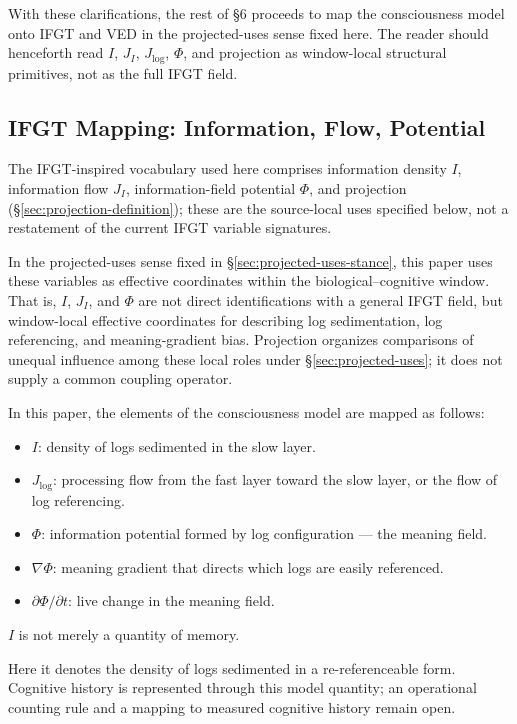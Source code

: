 With these clarifications, the rest of §6 proceeds to map the
consciousness model onto IFGT and VED in the projected-uses sense fixed
here. The reader should henceforth read \(I\), \(J_I\),
\(J_{\mathrm{log}}\), \(\Phi\), and projection as window-local
structural primitives, not as the full IFGT field.

\subsection{IFGT Mapping: Information, Flow, Potential}


The IFGT-inspired vocabulary used here comprises information density $I$, information flow $J_I$, information-field potential $\Phi$, and projection (§\ref{sec:projection-definition}); these are the source-local uses specified below, not a restatement of the current IFGT variable signatures.

In the projected-uses sense fixed in §\ref{sec:projected-uses-stance}, this paper uses these variables as effective coordinates within the biological--cognitive window. That is, $I$, $J_I$, and $\Phi$ are not direct identifications with a general IFGT field, but window-local effective coordinates for describing log sedimentation, log referencing, and meaning-gradient bias. Projection organizes comparisons of unequal influence among these local roles under §\ref{sec:projected-uses}; it does not supply a common coupling operator.

In this paper, the elements of the consciousness model are mapped as follows:

\begin{itemize}
\item $I$: density of logs sedimented in the slow layer.
\item $J_{\log}$: processing flow from the fast layer toward the slow layer, or the flow of log referencing.
\item $\Phi$: information potential formed by log configuration — the meaning field.
\item $\nabla\Phi$: meaning gradient that directs which logs are easily referenced.
\item $\partial\Phi/\partial t$: live change in the meaning field.
\end{itemize}

$I$ is not merely a quantity of memory.

Here it denotes the density of logs sedimented in a re-referenceable form. Cognitive history is represented through this model quantity; an operational counting rule and a mapping to measured cognitive history remain open.

